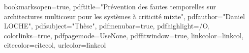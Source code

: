 \usepackage{color}

\hypersetup
{
bookmarksopen=true,
pdftitle="Prévention des fautes temporelles sur architectures multicœur pour les systèmes à criticité mixte",
pdfauthor="Daniel LOCHE", %
pdfsubject="Thèse", %
pdfmenubar=true, %
pdfhighlight=/O, %
colorlinks=true, %
pdfpagemode=UseNone, %
pdffitwindow=true, %
linkcolor=linkcol, %
citecolor=citecol, %
urlcolor=linkcol %
}


\setcounter{secnumdepth}{3}
\setcounter{tocdepth}{2}


\newcommand{\pd}[2]{\frac{\partial #1}{\partial #2}}
\def\abs{\operatorname{abs}}
\def\argmax{\operatornamewithlimits{arg\,max}}
\def\argmin{\operatornamewithlimits{arg\,min}}
\def\diag{\operatorname{Diag}}
\newcommand{\eqRef}[1]{(\ref{#1})}
\newcommand{\nline}{\smallbreak\noindent}

\usepackage{rotating}                    %
\usepackage{fancyhdr}                    %

  

\pagestyle{fancy}                       %
\fancyfoot{}                            %

